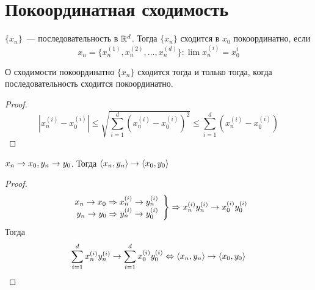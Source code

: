 \section{Покоординатная сходимость}
\begin{Def}
$\{x_n\}$~--- последовательность в $\mathbb{R}^d$. Тогда $\{x_n\}$ сходится в $x_0$ покоординатно, если 
$$x_n=\{x_n^{(1)}, x_n^{(2)}, \ldots, x_n^{(d)}\}\colon \lim x_n^{(i)} = x_0^i$$
\end{Def}
\begin{theorem}{О сходимости покоординатно}
$\{x_n\}$ сходится тогда и только тогда, когда последовательность сходится покоординатно.
\end{theorem}
\begin{proof}
$$\left|x_n^{(i)} - x_0^{(i)}\right| \leqslant \sqrt{\sum_{i=1}^d \left(x_n^{(i)} - x_0^{(i)}\right)^2} \leqslant \sum_{i=1}^d \left(x_n^{(i)} - x_0^{(i)}\right)$$
\end{proof}
\begin{conseq}
$x_n \rightarrow x_0, y_n \rightarrow y_0$. Тогда $\langle x_n, y_n\rangle \rightarrow \langle x_0, y_0\rangle$
\end{conseq}
\begin{proof}
$$\left.\begin{array}{rr} x_n \rightarrow x_0 \Rightarrow x_n^{(i)} \rightarrow y_n^{(i)}\\y_n \rightarrow y_0 \Rightarrow y_n^{(i)} \rightarrow y_0^{(i)}\end{array}\right\} \Rightarrow x_n^{(i)}y_n^{(i)} \rightarrow x_0^{(i)}y_0^{(i)}$$
Тогда $$\sum_{i=1}^d x_n^{(i)} y_n^{(i)} \rightarrow \sum_{i=1}^d x_0^{(i)} y_0^{(i)} \Leftrightarrow \langle x_n, y_n\rangle \rightarrow \langle x_0, y_0\rangle$$
\end{proof}